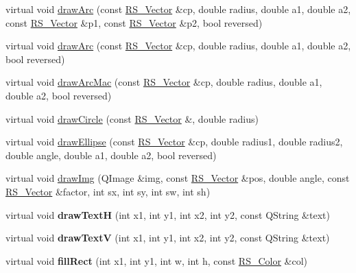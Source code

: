 \begin{DoxyCompactItemize}
\item 
virtual void \hyperlink{classRS__PainterQt_a12fddd8495a29adce0049879127aaf47}{draw\-Arc} (const \hyperlink{classRS__Vector}{R\-S\-\_\-\-Vector} \&cp, double radius, double a1, double a2, const \hyperlink{classRS__Vector}{R\-S\-\_\-\-Vector} \&p1, const \hyperlink{classRS__Vector}{R\-S\-\_\-\-Vector} \&p2, bool reversed)
\item 
virtual void \hyperlink{classRS__PainterQt_a66f9e1d16aac207b0669db54407ea851}{draw\-Arc} (const \hyperlink{classRS__Vector}{R\-S\-\_\-\-Vector} \&cp, double radius, double a1, double a2, bool reversed)
\item 
virtual void \hyperlink{classRS__PainterQt_a4d575ca97a3e9a96dee74640add2c8cc}{draw\-Arc\-Mac} (const \hyperlink{classRS__Vector}{R\-S\-\_\-\-Vector} \&cp, double radius, double a1, double a2, bool reversed)
\item 
virtual void \hyperlink{classRS__PainterQt_afa455cab8dda889c3e12bfcc20591834}{draw\-Circle} (const \hyperlink{classRS__Vector}{R\-S\-\_\-\-Vector} \&, double radius)
\item 
virtual void \hyperlink{classRS__PainterQt_a085f11791ad570cdc2cdcd0d115d73bb}{draw\-Ellipse} (const \hyperlink{classRS__Vector}{R\-S\-\_\-\-Vector} \&cp, double radius1, double radius2, double angle, double a1, double a2, bool reversed)
\item 
virtual void \hyperlink{classRS__PainterQt_a45bfb8c96798d414eab18058a51e9085}{draw\-Img} (Q\-Image \&img, const \hyperlink{classRS__Vector}{R\-S\-\_\-\-Vector} \&pos, double angle, const \hyperlink{classRS__Vector}{R\-S\-\_\-\-Vector} \&factor, int sx, int sy, int sw, int sh)
\item 
\hypertarget{classRS__PainterQt_ae515a6775c2f85cb682d7f7138ad133b}{virtual void {\bfseries draw\-Text\-H} (int x1, int y1, int x2, int y2, const Q\-String \&text)}\label{classRS__PainterQt_ae515a6775c2f85cb682d7f7138ad133b}

\item 
\hypertarget{classRS__PainterQt_a87ad3638b4ae441fc1022f792b70a28a}{virtual void {\bfseries draw\-Text\-V} (int x1, int y1, int x2, int y2, const Q\-String \&text)}\label{classRS__PainterQt_a87ad3638b4ae441fc1022f792b70a28a}

\item 
\hypertarget{classRS__PainterQt_a9d5194ddb44ac6c9f972e78107a76b69}{virtual void {\bfseries fill\-Rect} (int x1, int y1, int w, int h, const \hyperlink{classRS__Color}{R\-S\-\_\-\-Color} \&col)}\label{classRS__PainterQt_a9d5194ddb44ac6c9f972e78107a76b69}


\end{DoxyCompactItemize}
